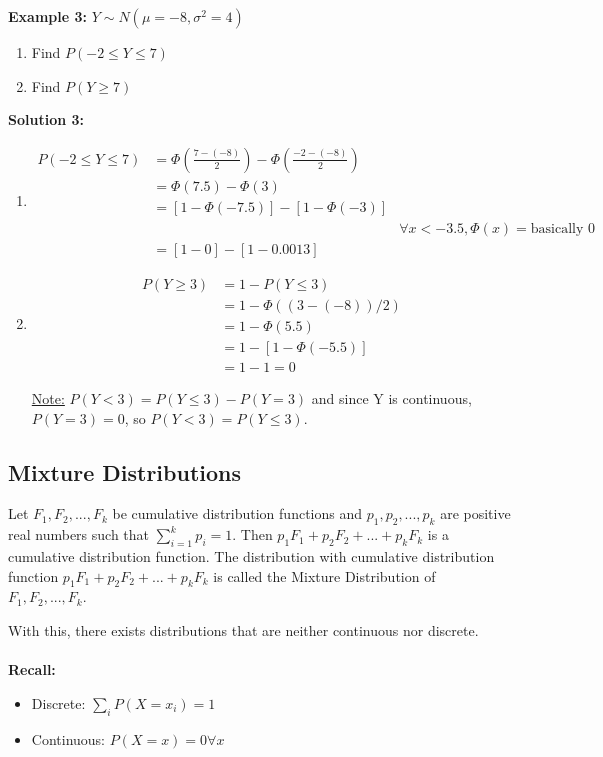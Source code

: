 \documentclass[12pt]{article}
\begin{document}
\textbf{Example 3:} $Y\sim N(\mu =-8, \sigma^2 = 4)$
\begin{enumerate}
	\item{Find $P(-2 \leq Y \leq 7)$}
	\item{Find $P(Y \geq 7)$}
\end{enumerate}

\textbf{Solution 3:}
\begin{enumerate}
	\item{
	\begin{align*}
		P(-2 \leq Y \leq 7) &= \Phi (\frac{7 - (-8)}{2}) - \Phi (\frac{-2 - (-8)}{2})\\
		&= \Phi (7.5) - \Phi (3)\\
		&= [1 - \Phi (-7.5)] - [1 - \Phi (-3)]\\
		&& \forall x < -3.5, \Phi (x) = \text{basically 0}\\
		&= [1-0]-[1-0.0013]
	\end{align*}
	}
	\item{
	\begin{align*}
		P(Y \geq 3) &= 1 - P(Y \leq 3)\\
		&= 1 - \Phi ((3-(-8))/2)\\
		&= 1 - \Phi (5.5)\\
		&= 1 - [1 - \Phi (-5.5)]\\
		&= 1-1 = 0
	\end{align*}

	}
	
	\underline{Note:} $P(Y < 3) = P(Y \leq 3) - P(Y = 3)$ and since Y is continuous, $P(Y = 3) = 0$, so $P(Y < 3) = P(Y \leq 3)$.
	
\end{enumerate}

\subsection{Mixture Distributions}

\begin{tcolorbox}[title=Definition: Mixture Distribution]
	Let $F_1, F_2, ... , F_k$ be cumulative distribution functions and $p_1, p_2, ..., p_k$ are positive real numbers such that $\sum_{i=1}^k p_i = 1$. Then $p_1 F_1 + p_2 F_2 + ... + p_k F_k$ is a cumulative distribution function. The distribution with cumulative distribution function $p_1 F_1 + p_2 F_2 + ... + p_k F_k$ is called the Mixture Distribution of $F_1, F_2, ..., F_k$.
\end{tcolorbox}

With this, there exists distributions that are neither continuous nor discrete.\\
\\
\textbf{Recall:} \begin{itemize}
	\item{Discrete: $\sum_i P(X = x_i) = 1$}
	\item{Continuous: $P(X = x) = 0 \forall x$}
\end{itemize}
\end{document}
